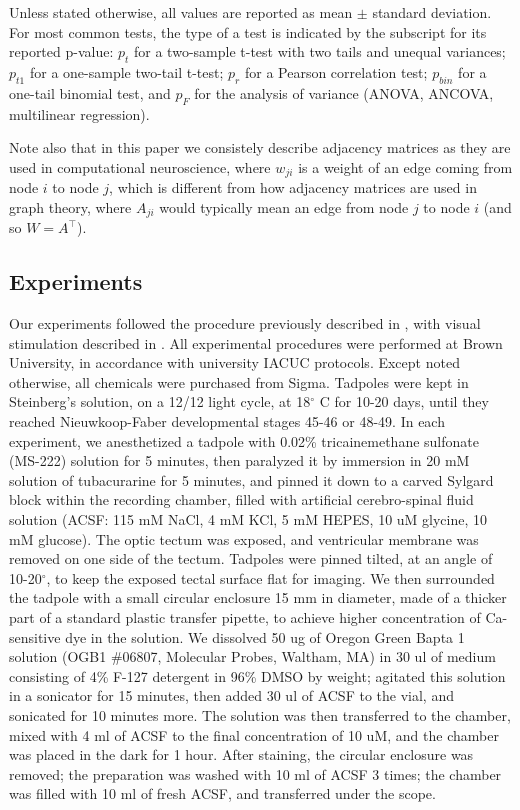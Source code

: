 \documentclass{article}
\begin{document}
Unless stated otherwise, all values are reported as mean $\pm$ standard deviation. For most common tests, the type of a test is indicated by the subscript for its reported p-value: $p_t$ for a two-sample t-test with two tails and unequal variances; $p_{t1}$ for a one-sample two-tail t-test; $p_r$ for a Pearson correlation test; $p_{bin}$ for a one-tail binomial test, and $p_F$ for the analysis of variance (ANOVA, ANCOVA, multilinear regression).

Note also that in this paper we consistely describe adjacency matrices as they are used in computational neuroscience, where $w_{ji}$ is a weight of an edge coming from node $i$ to node $j$, which is different from how adjacency matrices are used in graph theory, where $A_{ji}$ would typically mean an edge from node $j$ to node $i$ (and so $W = A^\top$).

\subsection*{Experiments}

Our experiments followed the procedure previously described in \citep{xu2011,truszkowski2017}, with visual stimulation described in \citep{khakhalin2014}. All experimental procedures were performed at Brown University, in accordance with university IACUC protocols. Except noted otherwise, all chemicals were purchased from Sigma. Tadpoles were kept in Steinberg’s solution, on a 12/12 light cycle, at 18$^\circ$ C for 10-20 days, until they reached Nieuwkoop-Faber developmental stages 45-46 or 48-49. In each experiment, we anesthetized a tadpole with 0.02\% tricainemethane sulfonate (MS-222) solution for 5 minutes, then paralyzed it by immersion in 20 mM solution of tubacurarine for 5 minutes, and pinned it down to a carved Sylgard block within the recording chamber, filled with artificial cerebro-spinal fluid solution (ACSF: 115 mM NaCl, 4 mM KCl, 5 mM HEPES, 10 uM glycine, 10 mM glucose). The optic tectum was exposed, and ventricular membrane was removed on one side of the tectum. Tadpoles were pinned tilted, at an angle of 10-20$^\circ$, to keep the exposed tectal surface flat for imaging. We then surrounded the tadpole with a small circular enclosure 15 mm in diameter, made of a thicker part of a standard plastic transfer pipette, to achieve higher concentration of Ca-sensitive dye in the solution. We dissolved 50 ug of Oregon Green Bapta 1 solution (OGB1 $\#$06807, Molecular Probes, Waltham, MA) in 30 ul of medium consisting of 4\% F-127 detergent in 96\% DMSO by weight; agitated this solution in a sonicator for 15 minutes, then added 30 ul of ACSF to the vial, and sonicated for 10 minutes more. The solution was then transferred to the chamber, mixed with 4 ml of ACSF to the final concentration of 10 uM, and the chamber was placed in the dark for 1 hour. After staining, the circular enclosure was removed; the preparation was washed with 10 ml of ACSF 3 times; the chamber was filled with 10 ml of fresh ACSF, and transferred under the scope.
\end{document}
